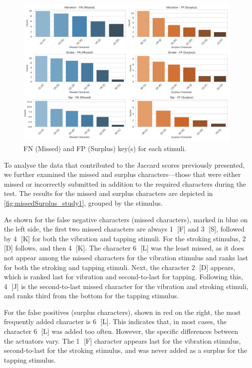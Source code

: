 \begin{figure}
    \centering
    \includegraphics[width=\linewidth]{src/pictures/Study1Data_Experiment/missed_surplus_test_study1.pdf}
    \caption{FN  (Missed) and FP (Surplus) key(s) for each stimuli.}
    \label{fig:missedSurplus_study1}
\end{figure}

To analyse the data that contributed to the Jaccard scores previously presented, we further examined the missed and surplus characters—those that were either missed or incorrectly submitted in addition to the required characters during the test. 
The results for the missed and surplus characters are depicted in \autoref{fig:missedSurplus_study1}, grouped by the stimulus.

As shown for the false negative characters (missed characters), marked in blue on the left side, the first two missed characters are always \textcircled{1} [F] and \textcircled{3} [S], followed by \textcircled{4} [K] for both the vibration and tapping stimuli. 
For the stroking stimulus, \textcircled{2} [D] follows, and then \textcircled{4} [K]. 
The character \textcircled{6} [L] was the least missed, as it does not appear among the missed characters for the vibration stimulus and ranks last for both the stroking and tapping stimuli. 
Next, the character \textcircled{2} [D] appears, which is ranked last for vibration and second-to-last for tapping. 
Following this, \textcircled{4} [J] is the second-to-last missed character for the vibration and stroking stimuli, and ranks third from the bottom for the tapping stimulus.

For the false positives (surplus characters), shown in red on the right, the most frequently added character is \textcircled{6} [L]. 
This indicates that, in most cases, the character \textcircled{6} [L] was added too often. However, the specific differences between the actuators vary. 
The \textcircled{1} [F] character appears last for the vibration stimulus, second-to-last for the stroking stimulus, and was never added as a surplus for the tapping stimulus.


